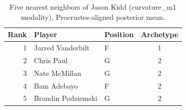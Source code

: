 \begin{table}[htbp]
  \centering\small
  \begin{tabular}{rllc}
    \toprule
    Rank & Player & Position & Archetype \\
    \midrule
    1 & Jarred Vanderbilt & F & 1 \\
    2 & Chris Paul & G & 2 \\
    3 & Nate McMillan & G & 2 \\
    4 & Bam Adebayo & F & 2 \\
    5 & Brandin Podziemski & G & 2 \\
    \bottomrule
  \end{tabular}
  \caption{Five nearest neighbors of Jason Kidd (curvature_m1 modality), Procrustes-aligned posterior mean.}
  \label{tab:Jason_Kidd_neighbors_curvature_m1}
\end{table}

